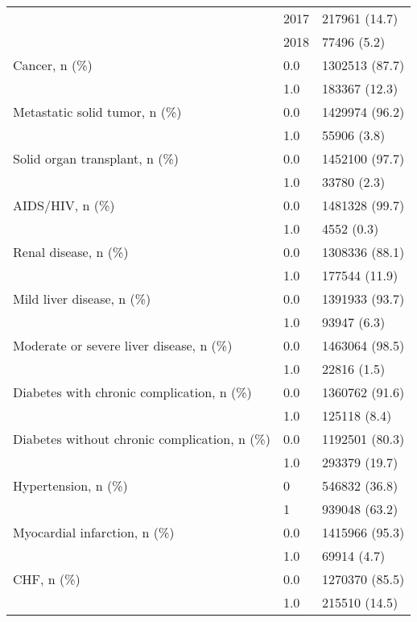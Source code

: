 \begin{tabular}{lll}
                                       & 2017 &      217961 (14.7) \\
                                       & 2018 &        77496 (5.2) \\
Cancer, n (\%) & 0.0 &     1302513 (87.7) \\
                                       & 1.0 &      183367 (12.3) \\
Metastatic solid tumor, n (\%) & 0.0 &     1429974 (96.2) \\
                                       & 1.0 &        55906 (3.8) \\
Solid organ transplant, n (\%) & 0.0 &     1452100 (97.7) \\
                                       & 1.0 &        33780 (2.3) \\
AIDS/HIV, n (\%) & 0.0 &     1481328 (99.7) \\
                                       & 1.0 &         4552 (0.3) \\
Renal disease, n (\%) & 0.0 &     1308336 (88.1) \\
                                       & 1.0 &      177544 (11.9) \\
Mild liver disease, n (\%) & 0.0 &     1391933 (93.7) \\
                                       & 1.0 &        93947 (6.3) \\
Moderate or severe liver disease, n (\%) & 0.0 &     1463064 (98.5) \\
                                       & 1.0 &        22816 (1.5) \\
Diabetes with chronic complication, n (\%) & 0.0 &     1360762 (91.6) \\
                                       & 1.0 &       125118 (8.4) \\
Diabetes without chronic complication, n (\%) & 0.0 &     1192501 (80.3) \\
                                       & 1.0 &      293379 (19.7) \\
Hypertension, n (\%) & 0 &      546832 (36.8) \\
                                       & 1 &      939048 (63.2) \\
Myocardial infarction, n (\%) & 0.0 &     1415966 (95.3) \\
                                       & 1.0 &        69914 (4.7) \\
CHF, n (\%) & 0.0 &     1270370 (85.5) \\
                                       & 1.0 &      215510 (14.5) \\

\end{tabular}
